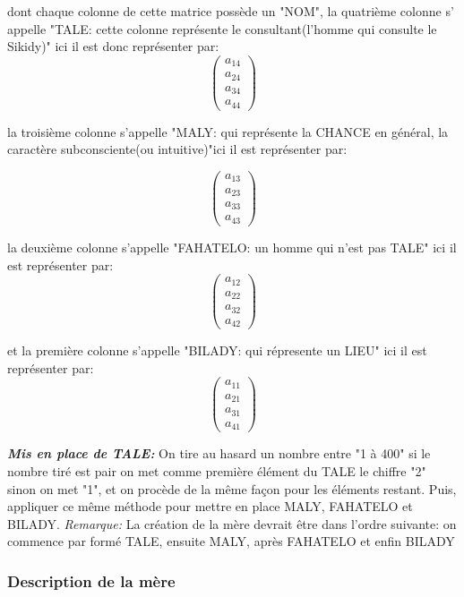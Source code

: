 \documentclass[12pt]{report}
\begin{document}
dont chaque colonne de cette matrice possède un "NOM", la quatrième colonne s' appelle "TALE: cette colonne représente le consultant(l'homme qui consulte le Sikidy)"
ici il est donc représenter par:
\[
\begin{pmatrix}
 a_{14} \\
 a_{24} \\
 a_{34} \\
 a_{44}
\end{pmatrix}
\]

la troisième colonne s'appelle "MALY: qui représente la CHANCE en général, la caractère subconsciente(ou intuitive)"ici il est représenter par:

\[
\begin{pmatrix}
a_{13} \\
a_{23} \\
a_{33} \\
a_{43}
\end{pmatrix}
\]

la deuxième colonne s'appelle "FAHATELO: un homme qui n'est pas TALE" ici il est représenter par:
\[
\begin{pmatrix}
a_{12} \\
a_{22} \\
a_{32} \\
a_{42}
\end{pmatrix}
\]

et la première colonne s'appelle "BILADY: qui répresente un LIEU" ici il est représenter par:
\[
\begin{pmatrix}
a_{11} \\
a_{21} \\
a_{31} \\
a_{41}
\end{pmatrix}
\]

\textbf{\textit{Mis en place de TALE:}} On tire au hasard un nombre entre "1 à 400" si le nombre tiré est pair on met comme première élément du TALE le chiffre "2" sinon on met "1", et on procède de la même façon pour les éléments restant. Puis, appliquer ce même méthode pour mettre en place MALY, FAHATELO et BILADY.\newline
\textit{Remarque:} La création de la mère devrait être dans l'ordre suivante: on commence par formé TALE, ensuite MALY, après FAHATELO et enfin BILADY  

\subsubsection{Description de la mère}
\end{document}
